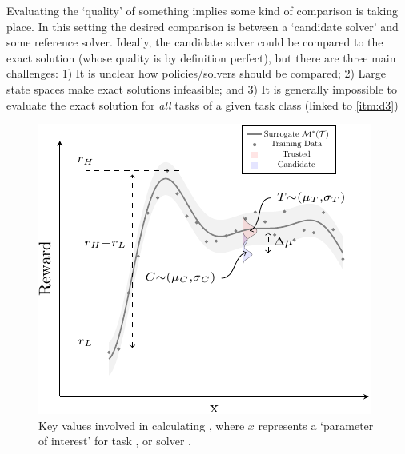     Evaluating the `quality' of something implies some kind of comparison is taking place. In this setting the desired comparison is between a `candidate solver' \solve{} and some reference solver. Ideally, the candidate solver could be compared to the exact solution (whose quality is by definition perfect), but there are three main challenges: 1) It is unclear how policies/solvers should be compared; 2) Large state spaces make exact solutions infeasible; and 3) It is generally impossible to evaluate the exact solution for \emph{all} tasks of a given task class \taskclass{} (linked to \ref{itm:d3})
    \begin{figure}[tb]
        \centering
        \includegraphics[width=0.7\linewidth]{Figures/sq_v2_fig-crop}
        \caption{Key values involved in calculating \xQ, where $x$ represents a `parameter of interest' for task \task, or solver \solve.}
        \label{fig:sq_v2}
        \vspace{-0.2cm}
    \end{figure}
